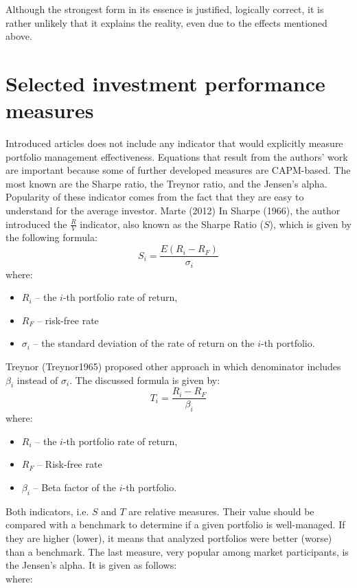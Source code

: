 \documentclass[]{article}
\providecommand{\tightlist}{%
  \setlength{\itemsep}{0pt}\setlength{\parskip}{0pt}}
\begin{document}
Although the strongest form in its essence is justified, logically
correct, it is rather unlikely that it explains the reality, even due to
the effects mentioned above.

\section{Selected investment performance
measures}\label{selected-investment-performance-measures}

Introduced articles does not include any indicator that would explicitly
measure portfolio management effectiveness. Equations that result from
the authors' work are important because some of further developed
measures are CAPM-based. The most known are the Sharpe ratio, the
Treynor ratio, and the Jensen's alpha. Popularity of these indicator
comes from the fact that they are easy to understand for the average
investor. Marte (2012) In Sharpe (1966), the author introduced the
\(\frac{R}{V}\) indicator, also known as the Sharpe Ratio (\(S\)), which
is given by the following formula: \[
S_i=\frac{E(R_i-R_F)}{\sigma_i}
\] where:

\begin{itemize}
\tightlist
\item
  \(R_i\) -- the \(i\)-th portfolio rate of return,
\item
  \(R_F\) -- risk-free rate
\item
  \(\sigma_i\) -- the standard deviation of the rate of return on the
  \(i\)-th portfolio.
\end{itemize}

Treynor (Treynor1965) proposed other approach in which denominator
includes \(\beta_i\) instead of \(\sigma_i\). The discussed formula is
given by: \[
T_i=\frac{R_i-R_F}{\beta_i}
\] where:

\begin{itemize}
\tightlist
\item
  \(R_i\) -- the \(i\)-th portfolio rate of return,
\item
  \(R_F\) -- Risk-free rate
\item
  \(\beta_i\) -- Beta factor of the \(i\)-th portfolio.
\end{itemize}

Both indicators, i.e. \(S\) and \(T\) are relative measures. Their value
should be compared with a benchmark to determine if a given portfolio is
well-managed. If they are higher (lower), it means that analyzed
portfolios were better (worse) than a benchmark. The last measure, very
popular among market participants, is the Jensen's alpha. It is given as
follows: \[
\] where:
\end{document}
